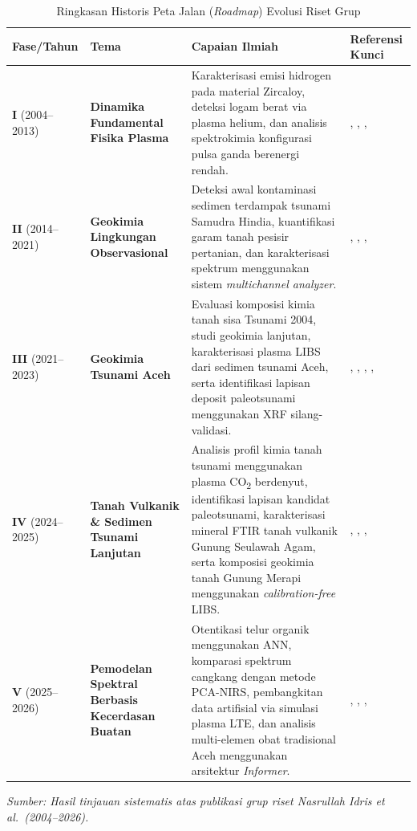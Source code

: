 \begin{table}[htbp]
\centering
\caption{Ringkasan Historis Peta Jalan (\textit{Roadmap}) Evolusi Riset Grup}
\label{tab:roadmap_historis}
\renewcommand{\arraystretch}{1.5}
\begin{tabular}{@{} l p{3.0cm} p{5.0cm} p{3.5cm} @{}}
\toprule
\textbf{Fase/Tahun} & \textbf{Tema} & \textbf{Capaian Ilmiah} & \textbf{Referensi Kunci} \\ \midrule

\textbf{I} (2004--2013) & \textbf{Dinamika Fundamental Fisika Plasma} &
Karakterisasi emisi hidrogen pada material Zircaloy, deteksi logam berat via plasma helium, dan analisis spektrokimia konfigurasi pulsa ganda berenergi rendah. &
\citep{idris_characteristics_2004}, \citep{kurniawan_hydrogen_2004}, \citep{idris_analysis_2007}, \citep{colao_quarry_2010} \\ \midrule

\textbf{II} (2014--2021) & \textbf{Geokimia Lingkungan Observasional} &
Deteksi awal kontaminasi sedimen terdampak tsunami Samudra Hindia, kuantifikasi garam tanah pesisir pertanian, dan karakterisasi spektrum menggunakan sistem \textit{multichannel analyzer}. &
\citep{idris_excitation_2015}, \citep{sari_investigation_2020}, \citep{idris_detection_2018}, \citep{idris_geochemistry_2022-1} \\ \midrule

\textbf{III} (2021--2023) & \textbf{Geokimia Tsunami Aceh} &
Evaluasi komposisi kimia tanah sisa Tsunami 2004, studi geokimia lanjutan, karakterisasi plasma LIBS dari sedimen tsunami Aceh, serta identifikasi lapisan deposit paleotsunami menggunakan XRF silang-validasi. &
\citep{sari_new_2021}, \citep{idris_geochemistry_2022}, \citep{mitaphonna_characteristics_2023}, \citep{ramli_elemental_2023-1}, \citep{mitaphonna_x-ray_2023} \\ \midrule

\textbf{IV} (2024--2025) & \textbf{Tanah Vulkanik \& Sedimen Tsunami Lanjutan} &
Analisis profil kimia tanah tsunami menggunakan plasma CO\textsubscript{2} berdenyut, identifikasi lapisan kandidat paleotsunami, karakterisasi mineral FTIR tanah vulkanik Gunung Seulawah Agam, serta komposisi geokimia tanah Gunung Merapi menggunakan \textit{calibration-free} LIBS. &
\citep{mitaphonna_pulsed_2024}, \citep{mitaphonna_preliminary_2024}, \citep{aliandri_evaluation_2025}, \citep{khumaeni_analysis_2025} \\ \midrule

\textbf{V} (2025--2026) & \textbf{Pemodelan Spektral Berbasis Kecerdasan Buatan} &
Otentikasi telur organik menggunakan ANN, komparasi spektrum cangkang dengan metode PCA-NIRS, pembangkitan data artifisial via simulasi plasma LTE, dan analisis multi-elemen obat tradisional Aceh menggunakan arsitektur \textit{Informer}. &
\citep{subki_analysis_2025}, \citep{qusthalani_comparing_2025}, \citep{walidain_spectroscopic_2025}, \citep{walidain_informer-based_2026} \\ \bottomrule

\end{tabular}
\vspace{2mm}
\par
\textit{Sumber: Hasil tinjauan sistematis atas publikasi grup riset Nasrullah Idris et al.\ (2004--2026).}
\end{table}
